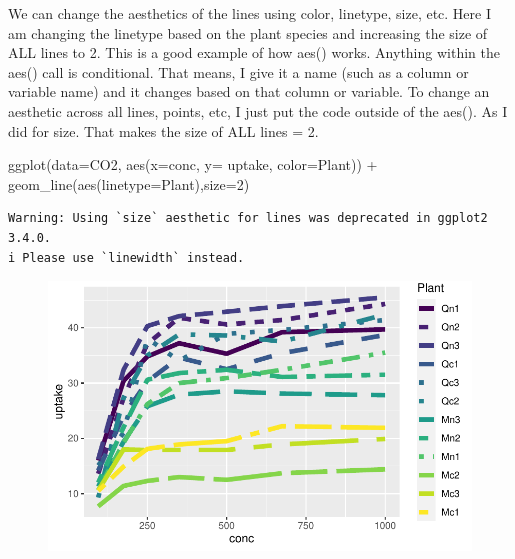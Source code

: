 \documentclass[
  letterpaper,
  DIV=11,
  numbers=noendperiod]{scrartcl}
\newenvironment{Shaded}{\begin{snugshade}}{\end{snugshade}}
\newcommand{\AttributeTok}[1]{\textcolor[rgb]{0.40,0.45,0.13}{#1}}
\newcommand{\DecValTok}[1]{\textcolor[rgb]{0.68,0.00,0.00}{#1}}
\newcommand{\FunctionTok}[1]{\textcolor[rgb]{0.28,0.35,0.67}{#1}}
\newcommand{\NormalTok}[1]{\textcolor[rgb]{0.00,0.23,0.31}{#1}}
\newcommand{\SpecialCharTok}[1]{\textcolor[rgb]{0.37,0.37,0.37}{#1}}
\begin{document}
We can change the aesthetics of the lines using color, linetype, size,
etc. Here I am changing the linetype based on the plant species and
increasing the size of ALL lines to 2. This is a good example of how
aes() works. Anything within the aes() call is conditional. That means,
I give it a name (such as a column or variable name) and it changes
based on that column or variable. To change an aesthetic across all
lines, points, etc, I just put the code outside of the aes(). As I did
for size. That makes the size of ALL lines = 2.

\begin{Shaded}
\begin{Highlighting}[]
\FunctionTok{ggplot}\NormalTok{(}\AttributeTok{data=}\NormalTok{CO2, }\FunctionTok{aes}\NormalTok{(}\AttributeTok{x=}\NormalTok{conc, }\AttributeTok{y=}\NormalTok{ uptake, }\AttributeTok{color=}\NormalTok{Plant)) }\SpecialCharTok{+}
  \FunctionTok{geom\_line}\NormalTok{(}\FunctionTok{aes}\NormalTok{(}\AttributeTok{linetype=}\NormalTok{Plant),}\AttributeTok{size=}\DecValTok{2}\NormalTok{)}
\end{Highlighting}
\end{Shaded}

\begin{verbatim}
Warning: Using `size` aesthetic for lines was deprecated in ggplot2 3.4.0.
i Please use `linewidth` instead.
\end{verbatim}

\begin{figure}[H]

{\centering \includegraphics{basic_graphs_files/figure-pdf/unnamed-chunk-14-1.pdf}

}

\end{figure}
\end{document}
